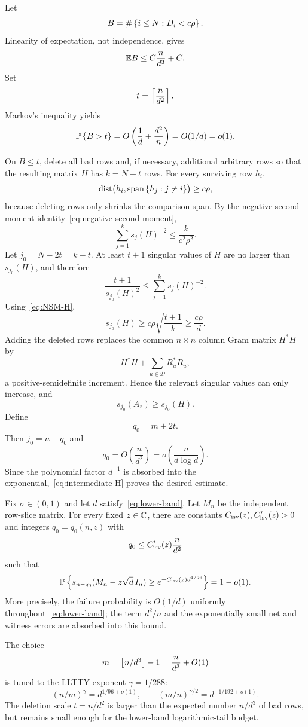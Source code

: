 Let
\[
  B=\#\left\{i\le N:D_i<c\rho\right\}.
\]
Linearity of expectation, not independence, gives
\[
  \mathbb E B\le C\frac n{d^3}+C.
\]
Set
\[
  t=\left\lceil \frac n{d^2}\right\rceil.
\]
Markov's inequality yields
\begin{equation}\label{eq:bad-row-Markov}
  \mathbb P\left\{B>t\right\}
  =O\left(\frac1d+\frac{d^2}{n}\right)
  =O(1/d)=o(1).
\end{equation}

On $B\le t$, delete all bad rows and, if necessary, additional arbitrary rows so that the resulting matrix $H$ has $k=N-t$ rows. For every surviving row $h_i$,
\[
  \operatorname{dist}\bigl(h_i,\operatorname{span}\left\{h_j:j\ne i\right\}\bigr)\ge c\rho,
\]
because deleting rows only shrinks the comparison span. By the negative second-moment identity~\eqref{eq:negative-second-moment},
\begin{equation}\label{eq:NSM-H}
  \sum_{j=1}^ks_j(H)^{-2}\le\frac{k}{c^2\rho^2}.
\end{equation}
Let $j_0=N-2t=k-t$. At least $t+1$ singular values of $H$ are no larger than $s_{j_0}(H)$, and therefore
\[
  \frac{t+1}{s_{j_0}(H)^2}
  \le\sum_{j=1}^ks_j(H)^{-2}.
\]
Using~\eqref{eq:NSM-H},
\begin{equation}\label{eq:intermediate-H}
  s_{j_0}(H)
  \ge c\rho\sqrt{\frac{t+1}{k}}
  \ge\frac{c\rho}{d}.
\end{equation}
Adding the deleted rows replaces the common $n\times n$ column Gram matrix $H^*H$ by
\[
  H^*H+\sum_{u\in\mathcal D}R_u^*R_u,
\]
a positive-semidefinite increment. Hence the relevant singular values can only increase, and
\[
  s_{j_0}(A_z)\ge s_{j_0}(H).
\]
Define
\[
  q_0=m+2t.
\]
Then $j_0=n-q_0$ and
\begin{equation}\label{eq:q0-scale}
  q_0=O\left(\frac n{d^2}\right)
  =o\left(\frac n{d\log d}\right).
\end{equation}
Since the polynomial factor $d^{-1}$ is absorbed into the exponential,~\eqref{eq:intermediate-H} proves the desired estimate.

\begin{theorem}\label{thm:intermediate}
Fix $\sigma\in(0,1)$ and let $d$ satisfy~\eqref{eq:lower-band}. Let $M_n$ be the independent row-slice matrix. For every fixed $z\in\mathbb C$, there are constants $C_{\mathrm{isv}}(z),C'_{\mathrm{isv}}(z)>0$ and integers $q_0=q_0(n,z)$ with
\[
  q_0\le C'_{\mathrm{isv}}(z)\frac n{d^2}
\]
such that
\[
  \mathbb P\left\{s_{n-q_0}(M_n-z\sqrt d\,I_n)
  \ge e^{-C_{\mathrm{isv}}(z)d^{1/96}}\right\}=1-o(1).
\]
More precisely, the failure probability is $O(1/d)$ uniformly throughout~\eqref{eq:lower-band}; the term $d^2/n$ and the exponentially small net and witness errors are absorbed into this bound.
\end{theorem}

\begin{remark}
The choice
\[
  m=\left\lfloor n/d^3\right\rfloor-1=\frac n{d^3}+O(1)
\]
is tuned to the LLTTY exponent $\gamma=1/288$:
\[
  (n/m)^\gamma=d^{1/96+o(1)},
  \qquad
  (m/n)^{\gamma/2}=d^{-1/192+o(1)}.
\]
The deletion scale $t=n/d^2$ is larger than the expected number $n/d^3$ of bad rows, but remains small enough for the lower-band logarithmic-tail budget.
\end{remark}
